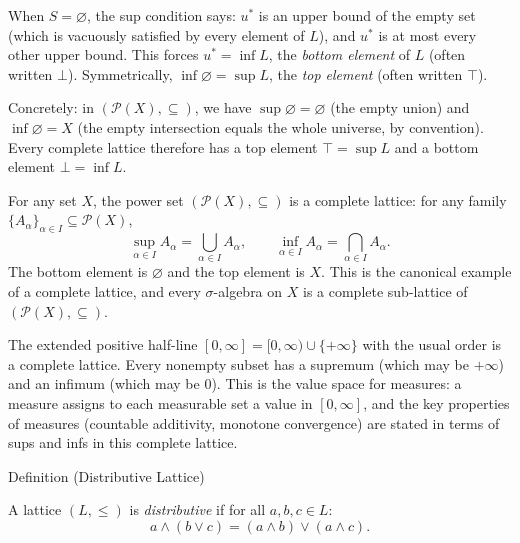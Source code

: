 \begin{remark*}
\label{rem:complete-top-bottom}
When $S = \varnothing$, the sup condition says: $u^*$ is an upper bound of
the empty set (which is vacuously satisfied by every element of $L$), and $u^*$
is at most every other upper bound.  This forces $u^* = \inf L$, the
\emph{bottom element} of $L$ (often written $\bot$).  Symmetrically,
$\inf \varnothing = \sup L$, the \emph{top element} (often written $\top$).

Concretely: in $(\mathcal{P}(X), \subseteq)$, we have $\sup \varnothing =
\varnothing$ (the empty union) and $\inf \varnothing = X$ (the empty
intersection equals the whole universe, by convention).  Every complete
lattice therefore has a top element $\top = \sup L$ and a bottom element
$\bot = \inf L$.
\end{remark*}

\begin{example*}
\label{ex:power-set-complete}
For any set $X$, the power set $(\mathcal{P}(X), \subseteq)$ is a complete
lattice: for any family $\{A_\alpha\}_{\alpha \in I} \subseteq \mathcal{P}(X)$,
\[
  \sup_{\alpha \in I} A_\alpha = \bigcup_{\alpha \in I} A_\alpha,
  \qquad
  \inf_{\alpha \in I} A_\alpha = \bigcap_{\alpha \in I} A_\alpha.
\]
The bottom element is $\varnothing$ and the top element is $X$.  This is the
canonical example of a complete lattice, and every $\sigma$-algebra on $X$ is a
complete sub-lattice of $(\mathcal{P}(X), \subseteq)$.
\end{example*}

\begin{example*}
\label{ex:extended-positive}
The extended positive half-line $[0,\infty] = [0,\infty) \cup \{+\infty\}$
with the usual order is a complete lattice.  Every nonempty subset has a
supremum (which may be $+\infty$) and an infimum (which may be $0$).  This
is the value space for measures: a measure assigns to each measurable set
a value in $[0,\infty]$, and the key properties of measures (countable
additivity, monotone convergence) are stated in terms of sups and infs in
this complete lattice.
\end{example*}


\begin{definitionbox}{Definition (Distributive Lattice)}
\begin{definition}\label{def:distributive-lattice}
A lattice $(L, \leq)$ is \emph{distributive} if for all $a, b, c \in L$:
\[
  a \wedge (b \vee c) = (a \wedge b) \vee (a \wedge c).
\]
\end{definition}
\end{definitionbox}

